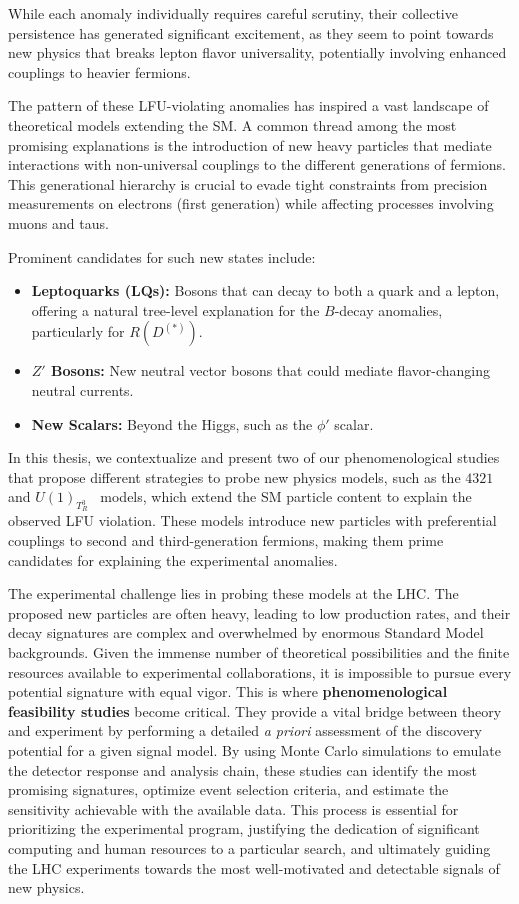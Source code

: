 While each anomaly individually requires careful scrutiny, their collective persistence has generated significant excitement, as they seem to point towards new physics that breaks lepton flavor universality, potentially involving enhanced couplings to heavier fermions.


The pattern of these LFU-violating anomalies has inspired a vast landscape of theoretical models extending the SM. A common thread among the most promising explanations is the introduction of new heavy particles that mediate interactions with non-universal couplings to the different generations of fermions. This generational hierarchy is crucial to evade tight constraints from precision measurements on electrons (first generation) while affecting processes involving muons and taus.

Prominent candidates for such new states include:
\begin{itemize}
    \item \textbf{Leptoquarks (LQs):} Bosons that can decay to both a quark and a lepton, offering a natural tree-level explanation for the $B$-decay anomalies, particularly for $R(D^{(*)})$.
    \item \textbf{$Z'$ Bosons:} New neutral vector bosons that could mediate flavor-changing neutral currents.
    \item \textbf{New Scalars:} Beyond the Higgs, such as the $\phi'$ scalar.
\end{itemize}

In this thesis, we contextualize and present two of our phenomenological studies that propose different strategies to probe new physics models, such as the $4321$~\cite{Florez2023} and $U(1)_{T^3_R}$~\cite{Qureshi:2024naw} models, which extend the SM particle content to explain the observed LFU violation. These models introduce new particles with preferential couplings to second and third-generation fermions, making them prime candidates for explaining the experimental anomalies.

The experimental challenge lies in probing these models at the LHC. The proposed new particles are often heavy, leading to low production rates, and their decay signatures are complex and overwhelmed by enormous Standard Model backgrounds. Given the immense number of theoretical possibilities and the finite resources available to experimental collaborations, it is impossible to pursue every potential signature with equal vigor. This is where \textbf{phenomenological feasibility studies} become critical. They provide a vital bridge between theory and experiment by performing a detailed \textit{a priori} assessment of the discovery potential for a given signal model. By using Monte Carlo simulations to emulate the detector response and analysis chain, these studies can identify the most promising signatures, optimize event selection criteria, and estimate the sensitivity achievable with the available data. This process is essential for prioritizing the experimental program, justifying the dedication of significant computing and human resources to a particular search, and ultimately guiding the LHC experiments towards the most well-motivated and detectable signals of new physics.

